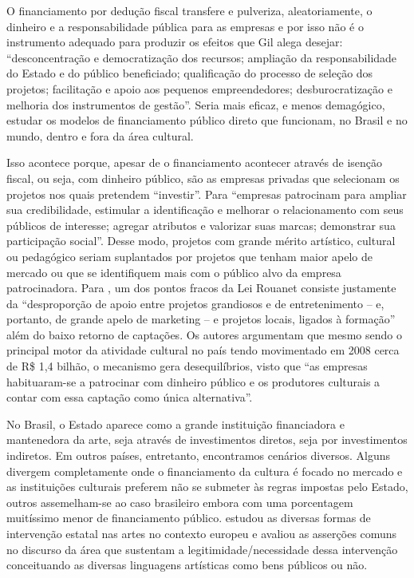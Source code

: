 \documentclass[a4paper, 12pt, openright, oneside, german, french, english, brazil]{abntex2}
\begin{document}
	\begin{citacao}
		O financiamento por dedução fiscal transfere e pulveriza, aleatoriamente, o dinheiro e a responsabilidade pública para as empresas e por	isso não é o instrumento adequado para produzir os efeitos que Gil alega desejar: ``desconcentração e democratização dos recursos; ampliação da responsabilidade do Estado e do público beneficiado; qualificação do processo de seleção dos projetos; facilitação e	apoio aos pequenos empreendedores; desburocratização e melhoria dos instrumentos de gestão”. Seria mais eficaz, e menos demagógico, estudar os modelos de financiamento público	direto que funcionam, no Brasil e no mundo,	dentro e fora da área cultural. \cite[p. 25]{sarkovas2005incentivo}
	\end{citacao}

	Isso acontece porque, apesar de o financiamento acontecer através de isenção fiscal, ou seja, com dinheiro público, são as empresas privadas que selecionam os projetos nos quais pretendem ``investir''. Para  ``empresas patrocinam para ampliar sua credibilidade, estimular a identificação e melhorar o relacionamento com seus públicos de interesse; agregar atributos e valorizar suas marcas; demonstrar sua participação social''. Desse modo, projetos com grande mérito artístico, cultural ou pedagógico seriam suplantados por projetos que tenham maior apelo de mercado ou que se identifiquem mais com o público alvo da empresa patrocinadora. Para , um dos pontos fracos da Lei Rouanet consiste justamente da ``desproporção de apoio entre projetos grandiosos e de entretenimento -- e, portanto, de grande apelo de marketing -- e projetos locais, ligados à formação'' além do baixo retorno de captações. Os autores argumentam que mesmo sendo o principal motor da atividade cultural no país tendo movimentado em 2008 cerca de R\$ 1,4 bilhão, o mecanismo gera desequilíbrios, visto que ``as empresas habituaram-se a patrocinar com dinheiro público e os produtores culturais a contar com essa captação como única alternativa''\cite[pos. 475]{weiss2009estatais}.


	No Brasil, o Estado aparece como a grande instituição financiadora e mantenedora da arte, seja através de investimentos diretos, seja por investimentos indiretos. Em outros países, entretanto, encontramos cenários diversos. Alguns divergem completamente onde o financiamento da cultura é focado no mercado e as instituições culturais preferem não se submeter às regras impostas pelo Estado, outros assemelham-se ao caso brasileiro embora com uma porcentagem muitíssimo menor de financiamento público.  estudou as diversas formas de intervenção estatal nas artes no contexto europeu e avaliou as asserções comuns no discurso da área que sustentam a legitimidade/necessidade dessa intervenção conceituando as diversas linguagens artísticas como bens públicos ou não.
\end{document}
